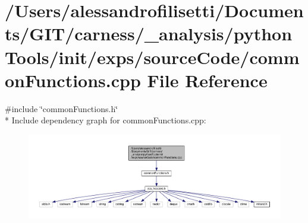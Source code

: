 \hypertarget{a00056}{\section{/\+Users/alessandrofilisetti/\+Documents/\+G\+I\+T/carness/\+\_\+analysis/python\+Tools/init/exps/source\+Code/common\+Functions.cpp File Reference}
\label{a00056}
}
{\ttfamily \#include \char`\"{}common\+Functions.\+h\char`\"{}}\\*
Include dependency graph for common\+Functions.\+cpp\+:\nopagebreak
\begin{figure}[H]
\begin{center}
\leavevmode
\includegraphics[width=350pt]{a00172}
\end{center}
\end{figure}

